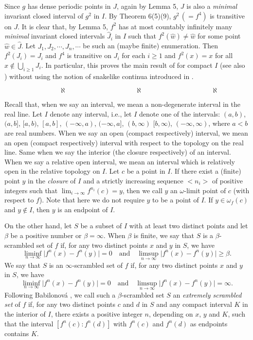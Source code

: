 \documentclass[12pt]{article}
\begin{document}
Since $g$ has dense periodic points in $J$, again by Lemma 5, $J$ is also a {\it minimal} invariant closed interval of $g^2$ in $I$.  By Theorem 6(5)(9), $g^2 \, (= f^4)$ is transitive on $J$.  It is clear that, by Lemma 5, $f^2$ has at most countably infinitely many {\it minimal} invariant closed intervals $\hat J_i$ in $I$ such that $f^2(\hat w) \ne \hat w$ for some point $\hat w \in \hat J$.  Let $J_1, J_2, \cdots, J_n, \cdots$ be such an (maybe finite) enumeration.  Then $f^2(J_i) = J_i$ and $f^4$ is transitive on $J_i$ for each $i \ge 1$ and $f^2(x) = x$ for all $x \notin \bigcup_{i \ge 1} J_i$.  In particular, this proves the main result of {\bf{\cite{barge1, bl}}} for compact $I$ (see also {\bf\cite{ru}}) without using the notion of snakelike continua introduced in {\bf\cite{bing}}.  

$\qquad\qquad\qquad\qquad \aleph \qquad\qquad\qquad\qquad\qquad \aleph \qquad\qquad\qquad\qquad\qquad \aleph$

\indent Recall that, when we say an interval, we mean a non-degenerate interval in the real line.  Let $I$ denote any interval, i.e., let $I$ denote one of the intervals: $(a, b)$, $(a, b]$, $[a, b)$, $[a, b]$, $(-\infty, a)$, $(-\infty, a]$, $(b, \infty)$ $[b, \infty)$, $(-\infty, \infty)$, where $a < b$ are real numbers.  When we say an open (compact respectively) interval, we mean an open (compact respectively) interval with respect to the topology on the real line.  Same when we say the interior (the closure respectively) of an interval.  When we say a relative open interval, we mean an interval which is relatively open in the relative topology on $I$.  Let $c$ be a point in $I$.  If there exist a (finite) point $y$ in the {\it closure} of $I$ and a strictly increasing sequence $< n_i >$ of positive integers such that $\lim_{i \to \infty} f^{n_i}(c) = y$, then we call $y$ an $\omega$-limit point of $c$ (with respect to $f$).  Note that here we do not require $y$ to be a point of $I$.  If $y \in \omega_f(c)$ and $y \notin I$, then $y$ is an endpoint of $I$.  

On the other hand, let $S$ be a subset of $I$ with at least two distinct points and let $\beta$ be a positive number or $\beta = \infty$.  When $\beta$ is finite, we say that $S$ is a $\beta$-scrambled set of $f$ if, for any two distinct points $x$ and $y$ in $S$, we have 
$$\liminf_{n \to \infty} \big|f^n(x) - f^n(y)\big| = 0 \quad \text{and} \quad \limsup_{n \to \infty} \big|f^n(x) - f^n(y)\big| \ge \beta.
$$  
We say that $S$ is an $\infty$-scrambled set of $f$ if, for any two distinct points $x$ and $y$ in $S$, we have 
$$\liminf_{n \to \infty} \big|f^n(x) - f^n(y)\big| = 0 \quad \text{and} \quad \limsup_{n \to \infty} \big|f^n(x) - f^n(y)\big| = \infty.
$$
\indent Following Babilonov\'a {\bf\cite{bab}}, we call such a $\beta$-scrambled set $S$ an {\it extremely scrambled set} of $f$ if, for any two distinct points $c$ and $d$ in $S$ and any compact interval $K$ in the interior of $I$, there exists a positive integer $n$, depending on $x$, $y$ and $K$, such that the interval $[f^{n}(c) : f^{n}(d)]$ with $f^n(c)$ and $f^n(d)$ as endpoints contains $K$.  
\end{document}
